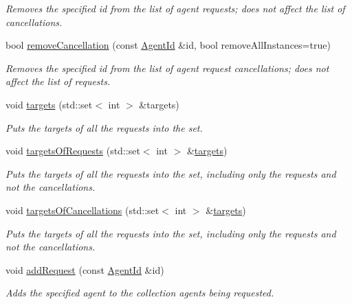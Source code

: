 \begin{DoxyCompactItemize}
\begin{DoxyCompactList}\small\item\em Removes the specified id from the list of agent requests; does not affect the list of cancellations. \end{DoxyCompactList}\item 
bool \hyperlink{classrepast_1_1_agent_request_a24c0912e47b149ee3aa24a5c6a5cff1a}{remove\-Cancellation} (const \hyperlink{classrepast_1_1_agent_id}{Agent\-Id} \&id, bool remove\-All\-Instances=true)
\begin{DoxyCompactList}\small\item\em Removes the specified id from the list of agent request cancellations; does not affect the list of requests. \end{DoxyCompactList}\item 
void \hyperlink{classrepast_1_1_agent_request_a3b46d7118e7e9f4bcf2d4c973bb9ceef}{targets} (std\-::set$<$ int $>$ \&targets)
\begin{DoxyCompactList}\small\item\em Puts the targets of all the requests into the set. \end{DoxyCompactList}\item 
void \hyperlink{classrepast_1_1_agent_request_af1bee79d13a5d15af1a00c9509b540ef}{targets\-Of\-Requests} (std\-::set$<$ int $>$ \&\hyperlink{classrepast_1_1_agent_request_a3b46d7118e7e9f4bcf2d4c973bb9ceef}{targets})
\begin{DoxyCompactList}\small\item\em Puts the targets of all the requests into the set, including only the requests and not the cancellations. \end{DoxyCompactList}\item 
void \hyperlink{classrepast_1_1_agent_request_a158490663d112ae0100478ca71de4908}{targets\-Of\-Cancellations} (std\-::set$<$ int $>$ \&\hyperlink{classrepast_1_1_agent_request_a3b46d7118e7e9f4bcf2d4c973bb9ceef}{targets})
\begin{DoxyCompactList}\small\item\em Puts the targets of all the requests into the set, including only the requests and not the cancellations. \end{DoxyCompactList}\item 
void \hyperlink{classrepast_1_1_agent_request_a357e606a76f671ce603e151e3b3759cb}{add\-Request} (const \hyperlink{classrepast_1_1_agent_id}{Agent\-Id} \&id)
\begin{DoxyCompactList}\small\item\em Adds the specified agent to the collection agents being requested. \end{DoxyCompactList}\item 

\end{DoxyCompactItemize}
